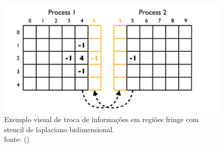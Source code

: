 \documentclass[../main/main.tex]{subfiles}
\begin{document}
\begin{frame}
    \begin{figure}
        \vspace{1cm}
        \centering
        \includegraphics[height=0.6\textheight]{imgs/fringe.png}
        \caption{Exemplo visual de troca de informações em regiões fringe com stencil de laplaciano bidimensional. \\ \centering fonte:  (\citeyear{raymundo})}
    \end{figure}
\end{frame}









\end{document}
